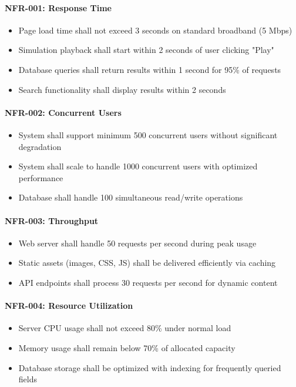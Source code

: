 \documentclass[12pt,a4paper]{article}
\begin{document}
\begin{enumerate}
\paragraph{NFR-001: Response Time}
\begin{itemize}
    \item Page load time shall not exceed 3 seconds on standard broadband (5 Mbps)
    \item Simulation playback shall start within 2 seconds of user clicking "Play"
    \item Database queries shall return results within 1 second for 95\% of requests
    \item Search functionality shall display results within 2 seconds
\end{itemize}

\paragraph{NFR-002: Concurrent Users}
\begin{itemize}
    \item System shall support minimum 500 concurrent users without significant degradation
    \item System shall scale to handle 1000 concurrent users with optimized performance
    \item Database shall handle 100 simultaneous read/write operations
\end{itemize}

\paragraph{NFR-003: Throughput}
\begin{itemize}
    \item Web server shall handle 50 requests per second during peak usage
    \item Static assets (images, CSS, JS) shall be delivered efficiently via caching
    \item API endpoints shall process 30 requests per second for dynamic content
\end{itemize}

\paragraph{NFR-004: Resource Utilization}
\begin{itemize}
    \item Server CPU usage shall not exceed 80\% under normal load
    \item Memory usage shall remain below 70\% of allocated capacity
    \item Database storage shall be optimized with indexing for frequently queried fields
\end{itemize}


\end{enumerate}
\end{document}

